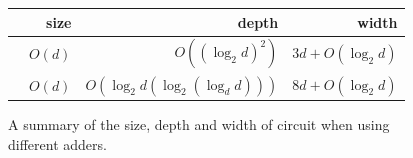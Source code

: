 \documentclass[notitlepage]{article}
\theoremstyle{definition}
\begin{document}
\begin{figure}
    \centering
    \begin{tabular}{lrrr}
        \toprule
                                    & size      & depth & width\\
        \midrule
        \cite{cuccaro2004new}       & $O(d)$    & $O\left({(\log_{2}d)}^{2}\right)$ & $3d + O(\log_{2}d)$\\ %
        \cite{Takahashi:2008:FQC}   & $O(d)$    & $O\left(\log_{2}d\left(\log_{2}(\log_{d}d)\right)\right)$ & $8d + O(\log_{2}d)$\\ %
        \bottomrule
    \end{tabular}
    \caption{A summary of the size, depth and width of circuit when using different adders.}\label{tab:GDW}
\end{figure}



\end{document}
